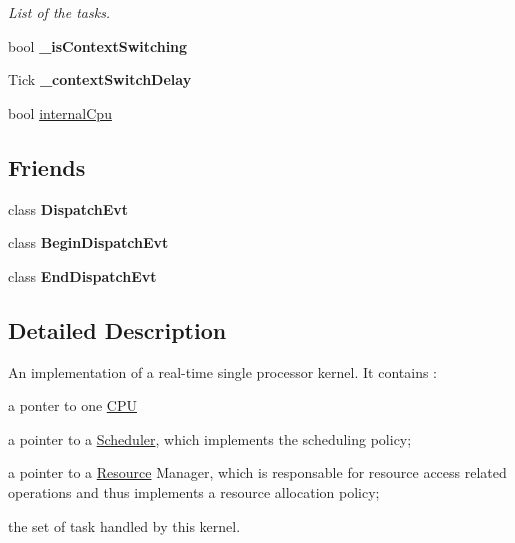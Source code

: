 \begin{DoxyCompactItemize}
\begin{DoxyCompactList}\small\item\em List of the tasks. \end{DoxyCompactList}\item 
bool {\bfseries \+\_\+is\+Context\+Switching}\hypertarget{classRTSim_1_1RTKernel_ada61dd77cf35ce0e573b373d58e17c46}{}\label{classRTSim_1_1RTKernel_ada61dd77cf35ce0e573b373d58e17c46}

\item 
Tick {\bfseries \+\_\+context\+Switch\+Delay}\hypertarget{classRTSim_1_1RTKernel_a07cfb107641531f116feb5be20975c84}{}\label{classRTSim_1_1RTKernel_a07cfb107641531f116feb5be20975c84}

\item 
bool \hyperlink{classRTSim_1_1RTKernel_aff329e6c8a49b2d35274b65a5b6b348e}{internal\+Cpu}
\end{DoxyCompactItemize}
\subsection*{Friends}
\begin{DoxyCompactItemize}
\item 
class {\bfseries Dispatch\+Evt}\hypertarget{classRTSim_1_1RTKernel_a57cee237f5e501dcd346440f0dacc159}{}\label{classRTSim_1_1RTKernel_a57cee237f5e501dcd346440f0dacc159}

\item 
class {\bfseries Begin\+Dispatch\+Evt}\hypertarget{classRTSim_1_1RTKernel_a66461f9646ef25f76aa349848fd2acb1}{}\label{classRTSim_1_1RTKernel_a66461f9646ef25f76aa349848fd2acb1}

\item 
class {\bfseries End\+Dispatch\+Evt}\hypertarget{classRTSim_1_1RTKernel_a8734b9ff7c1c12196edd3bde79e193bb}{}\label{classRTSim_1_1RTKernel_a8734b9ff7c1c12196edd3bde79e193bb}

\end{DoxyCompactItemize}


\subsection{Detailed Description}
An implementation of a real-\/time single processor kernel. It contains \+:


\begin{DoxyItemize}
\item a ponter to one \hyperlink{classRTSim_1_1CPU}{C\+PU}
\item a pointer to a \hyperlink{classRTSim_1_1Scheduler}{Scheduler}, which implements the scheduling policy;
\item a pointer to a \hyperlink{classRTSim_1_1Resource}{Resource} Manager, which is responsable for resource access related operations and thus implements a resource allocation policy;
\item the set of task handled by this kernel.
\end{DoxyItemize}

